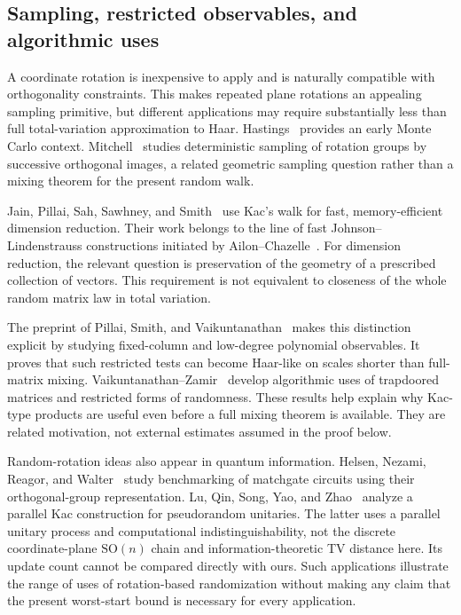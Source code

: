 \documentclass[11pt]{article}
\theoremstyle{definition}\newtheorem{definition}[theorem]{Definition}
\theoremstyle{remark}\newtheorem{remark}[theorem]{Remark}
\newcommand{\SO}{\mathrm{SO}}
\begin{document}
\subsection{Sampling, restricted observables, and algorithmic uses}
A coordinate rotation is inexpensive to apply and is naturally compatible with orthogonality constraints. This makes repeated plane rotations an appealing sampling primitive, but different applications may require substantially less than full total-variation approximation to Haar. Hastings~\cite{Hastings70} provides an early Monte Carlo context. Mitchell~\cite{Mitchell08} studies deterministic sampling of rotation groups by successive orthogonal images, a related geometric sampling question rather than a mixing theorem for the present random walk.

Jain, Pillai, Sah, Sawhney, and Smith~\cite{JPSSS22} use Kac's walk for fast, memory-efficient dimension reduction. Their work belongs to the line of fast Johnson--Lindenstrauss constructions initiated by Ailon--Chazelle~\cite{AilonChazelle06}. For dimension reduction, the relevant question is preservation of the geometry of a prescribed collection of vectors. This requirement is not equivalent to closeness of the whole random matrix law in total variation.

The preprint of Pillai, Smith, and Vaikuntanathan~\cite{PSV26} makes this distinction explicit by studying fixed-column and low-degree polynomial observables. It proves that such restricted tests can become Haar-like on scales shorter than full-matrix mixing. Vaikuntanathan--Zamir~\cite{VZ26} develop algorithmic uses of trapdoored matrices and restricted forms of randomness. These results help explain why Kac-type products are useful even before a full mixing theorem is available. They are related motivation, not external estimates assumed in the proof below.

Random-rotation ideas also appear in quantum information. Helsen, Nezami, Reagor, and Walter~\cite{HNRW22} study benchmarking of matchgate circuits using their orthogonal-group representation. Lu, Qin, Song, Yao, and Zhao~\cite{LQSYZ25} analyze a parallel Kac construction for pseudorandom unitaries. The latter uses a parallel unitary process and computational indistinguishability, not the discrete coordinate-plane $\SO(n)$ chain and information-theoretic TV distance here. Its update count cannot be compared directly with ours. Such applications illustrate the range of uses of rotation-based randomization without making any claim that the present worst-start bound is necessary for every application.
\end{document}
